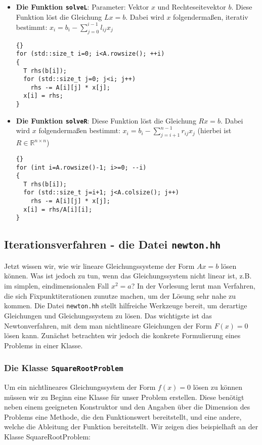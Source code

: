 \documentclass[a4paper,11pt]{article}
\theoremstyle{definition}
\begin{document}
\begin{itemize}
\item \textbf{Die Funktion \lstinline{solveL}}: Parameter: Vektor $x$
  und Rechteseitevektor $b$.  Diese Funktion löst die Gleichung
  $Lx=b$. Dabei wird $x$ folgendermaßen, iterativ bestimmt:
  $x_i= b_i - \sum_{j=0}^{i-1} l_{ij}x_j$

{\footnotesize{\begin{lstlisting}{}
for (std::size_t i=0; i<A.rowsize(); ++i)
{
  T rhs(b[i]);
  for (std::size_t j=0; j<i; j++)
    rhs -= A[i][j] * x[j];
  x[i] = rhs;
}
\end{lstlisting}}}

\item \textbf{Die Funktion \lstinline{solveR}}: Diese Funktion löst
  die Gleichung $Rx=b$. Dabei wird $x$ folgendermaßen bestimmt:
  $x_i= b_i - \sum_{j=i+1}^{n-1}r_{ij}x_j$ (hierbei ist
  $R \in \mathbb{R}^{n \times n}$)

{\footnotesize{\begin{lstlisting}{}
for (int i=A.rowsize()-1; i>=0; --i)
{
  T rhs(b[i]);
  for (std::size_t j=i+1; j<A.colsize(); j++)
    rhs -= A[i][j] * x[j];
  x[i] = rhs/A[i][i];
}
\end{lstlisting}}}

\end{itemize}



\subsection{Iterationsverfahren - die Datei \lstinline{newton.hh}}

Jetzt wissen wir, wie wir lineare Gleichungssysteme der Form $Ax = b$
lösen können. Was ist jedoch zu tun, wenn das Gleichungssystem nicht
linear ist, z.B. im simplen, eindimensionalen Fall $x^2 = a$? In der
Vorlesung lernt man Verfahren, die sich Fixpunktiterationen zunutze
machen, um der Lösung sehr nahe zu kommen. Die Datei
\lstinline{newton.hh} stellt hilfreiche Werkzeuge bereit, um derartige
Gleichungen und Gleichungssystem zu lösen. Das wichtigste ist das
Newtonverfahren, mit dem man nichtlineare Gleichungen der Form
$F(x) = 0$ lösen kann. Zunächst betrachten wir jedoch die konkrete
Formulierung eines Problems in einer Klasse.



\subsubsection{Die Klasse \lstinline{SquareRootProblem}}
Um ein nichtlineares Gleichungssystem der Form $f(x)=0$ lösen zu
können müssen wir zu Beginn eine Klasse für unser Problem
erstellen. Diese benötigt neben einem geeigneten Konstruktor und den
Angaben über die Dimension des Problems eine Methode, die den
Funktionswert bereitstellt, und eine andere, welche die Ableitung der
Funktion bereitstellt.  Wir zeigen dies beispielhaft an der Klasse
SquareRootProblem:
\end{document}
